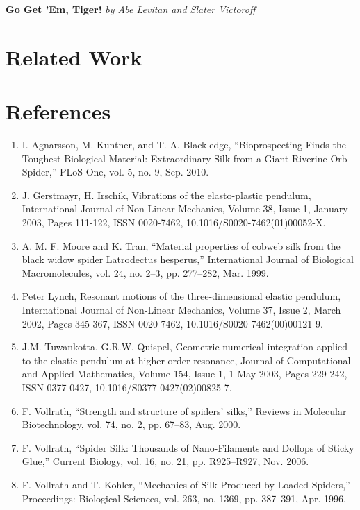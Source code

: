 \documentclass{article}
\begin{document}
{\LARGE \textbf{Go Get 'Em, Tiger!}}
\hfill
{\Large \emph{by Abe Levitan and Slater Victoroff}}\\
\FloatBarrier

\section{Related Work}

\section{References}

\begin{enumerate}
\item I. Agnarsson, M. Kuntner, and T. A. Blackledge, “Bioprospecting Finds the Toughest Biological Material: Extraordinary Silk from a Giant Riverine Orb Spider,” PLoS One, vol. 5, no. 9, Sep. 2010.

\item J. Gerstmayr, H. Irschik, Vibrations of the elasto-plastic pendulum, International Journal of Non-Linear Mechanics, Volume 38, Issue 1, January 2003, Pages 111-122, ISSN 0020-7462, 10.1016/S0020-7462(01)00052-X.

\item A. M. F. Moore and K. Tran, “Material properties of cobweb silk from the black widow spider Latrodectus hesperus,” International Journal of Biological Macromolecules, vol. 24, no. 2–3, pp. 277–282, Mar. 1999.

\item Peter Lynch, Resonant motions of the three-dimensional elastic pendulum, International Journal of Non-Linear Mechanics, Volume 37, Issue 2, March 2002, Pages 345-367, ISSN 0020-7462, 10.1016/S0020-7462(00)00121-9.

\item J.M. Tuwankotta, G.R.W. Quispel, Geometric numerical integration applied to the elastic pendulum at higher-order resonance, Journal of Computational and Applied Mathematics, Volume 154, Issue 1, 1 May 2003, Pages 229-242, ISSN 0377-0427, 10.1016/S0377-0427(02)00825-7.

\item F. Vollrath, “Strength and structure of spiders’ silks,” Reviews in Molecular Biotechnology, vol. 74, no. 2, pp. 67–83, Aug. 2000.

\item F. Vollrath, “Spider Silk: Thousands of Nano-Filaments and Dollops of Sticky Glue,” Current Biology, vol. 16, no. 21, pp. R925–R927, Nov. 2006.

\item F. Vollrath and T. Kohler, “Mechanics of Silk Produced by Loaded Spiders,” Proceedings: Biological Sciences, vol. 263, no. 1369, pp. 387–391, Apr. 1996.

\end{enumerate}
\end{document}
